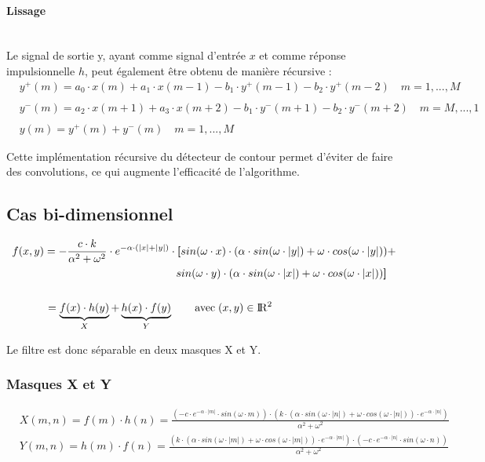 \paragraph{Lissage \\\\}

Le signal de sortie y, ayant comme signal d'entrée $ x $ et comme réponse impulsionnelle $ h $, peut également être obtenu de manière récursive :
\begin{align*}
& y^+(m) = a_0 \cdot x(m) + a_1 \cdot x(m-1) - b_1 \cdot y^+(m-1) - b_2 \cdot y^+(m-2) \quad m=1,...,M \\
& \\
& y^-(m) = a_2 \cdot x(m+1) + a_3 \cdot x(m+2) - b_1 \cdot y^-(m+1) - b_2 \cdot y^-(m+2) \quad m=M,...,1 \\
& \\
& y(m) = y^+(m) + y^-(m) \quad m=1,...,M 
\end{align*}

Cette implémentation récursive du détecteur de contour permet d'éviter de faire des convolutions, ce qui augmente l'efficacité de l'algorithme.

\subsection{Cas bi-dimensionnel}

\begin{align*}
& f(x,y) = -\frac{c \cdot k}{\alpha^2 + \omega^2} \cdot e^{- \alpha \cdot (|x| + |y|)} \cdot \textbf{[} sin(\omega \cdot x) \cdot (\alpha \cdot sin(\omega \cdot |y|) + \omega \cdot cos(\omega \cdot |y|)) + \\
& \hskip 15 em sin(\omega \cdot y) \cdot (\alpha \cdot sin(\omega \cdot |x|) + \omega \cdot cos(\omega \cdot |x|)) \textbf{]} \\
& \\
&  \qquad \quad = \underbrace{f(x) \cdot h(y)}_{X} + \underbrace{h(x) \cdot f(y)}_{Y} \qquad \text{avec} \; (x,y) \in \rm I\!R^2 \\
\end{align*}

Le filtre est donc séparable en deux masques X et Y.

\subsubsection{Masques X et Y}

\begin{align*}
& X(m,n)= f(m) \cdot h(n) = \frac{(-c \cdot e^{-\alpha \cdot |m|} \cdot sin(\omega \cdot m)) \cdot (k \cdot (\alpha \cdot sin(\omega \cdot |n|) + \omega \cdot cos(\omega \cdot |n|)) \cdot e^{-\alpha \cdot |n|})}{\alpha^2 + \omega^2} \\
& Y(m,n)= h(m) \cdot f(n) = \frac{(k \cdot (\alpha \cdot sin(\omega \cdot |m|) + \omega \cdot cos(\omega \cdot |m|)) \cdot e^{-\alpha \cdot |m|}) \cdot (-c \cdot e^{-\alpha \cdot |n|} \cdot sin(\omega \cdot n))}{\alpha^2 + \omega^2} 
\end{align*}


